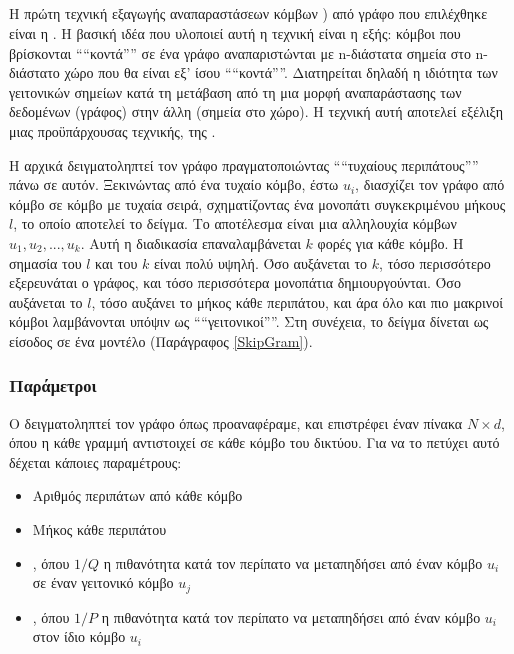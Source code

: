 \subsection{} \label{n2v}

Η πρώτη τεχνική εξαγωγής αναπαραστάσεων κόμβων ) από γράφο που επιλέχθηκε
είναι η  \cite{node2vec}. Η βασική ιδέα που υλοποιεί αυτή η τεχνική είναι η
εξής: κόμβοι που βρίσκονται ````κοντά'''' σε ένα γράφο αναπαριστώνται με n-διάστατα σημεία στο
n-διάστατο χώρο που θα είναι εξ' ίσου ````κοντά''''. Διατηρείται δηλαδή η ιδιότητα των γειτονικών
σημείων κατά τη μετάβαση από τη μια μορφή αναπαράστασης των δεδομένων (γράφος) στην άλλη
(σημεία στο χώρο). Η τεχνική αυτή αποτελεί εξέλιξη μιας προϋπάρχουσας τεχνικής, της
 \cite{DeepWalk}.

Η  αρχικά δειγματοληπτεί τον γράφο πραγματοποιώντας ````τυχαίους περιπάτους'''' πάνω
σε αυτόν. Ξεκινώντας από ένα τυχαίο κόμβο, έστω \(u_i\), διασχίζει τον γράφο από κόμβο σε κόμβο με
τυχαία σειρά, σχηματίζοντας ένα μονοπάτι συγκεκριμένου μήκους \(l\), το οποίο αποτελεί το
δείγμα. Το αποτέλεσμα είναι μια αλληλουχία κόμβων \({u_1, u_2,...,u_k}\). Αυτή η διαδικασία
επαναλαμβάνεται \(k\) φορές για κάθε κόμβο. Η σημασία του \(l\) και του \(k\) είναι πολύ
υψηλή. Όσο αυξάνεται το \(k\), τόσο περισσότερο εξερευνάται ο γράφος, και τόσο περισσότερα
μονοπάτια δημιουργούνται. Όσο αυξάνεται το \(l\), τόσο αυξάνει το μήκος κάθε περιπάτου, και
άρα όλο και πιο μακρινοί κόμβοι λαμβάνονται υπόψιν ως ````γειτονικοί''''. Στη συνέχεια, το δείγμα
δίνεται ως είσοδος σε ένα μοντέλο  (Παράγραφος \ref{SkipGram}).

\subsubsection{Παράμετροι }

Ο  δειγματοληπτεί τον γράφο όπως προαναφέραμε, και επιστρέφει έναν πίνακα 
\(N \times d\), όπου η κάθε γραμμή αντιστοιχεί σε κάθε κόμβο του δικτύου. Για να το πετύχει
αυτό δέχεται κάποιες παραμέτρους:

\begin{itemize}
    \item Αριθμός περιπάτων από κάθε κόμβο
    \item Μήκος κάθε περιπάτου
    \item {}, όπου \(1/Q\) η πιθανότητα κατά τον περίπατο να μεταπηδήσει 
    από έναν κόμβο \(u_i\) σε έναν γειτονικό κόμβο \(u_j\)
    \item {}, όπου \(1/P\) η πιθανότητα κατά τον περίπατο να μεταπηδήσει 
    από έναν κόμβο \(u_i\) στον ίδιο κόμβο \(u_i\)
\end{itemize}

